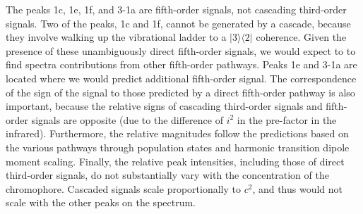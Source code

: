 The peaks 1c, 1e, 1f, and 3-1a are fifth-order signals, not cascading third-order signals. Two of the peaks, 1c and 1f, cannot be generated by a cascade, because they involve walking up the vibrational ladder to a $|3\rangle\langle2|$ coherence. Given the presence of these unambiguously direct fifth-order signals, we would expect to to find spectra contributions from other fifth-order pathways. Peaks 1e and 3-1a are located where we would predict additional fifth-order signal. The correspondence of the sign of the signal to those predicted by a direct fifth-order pathway is also important, because the relative signs of cascading third-order signals and fifth-order signals are opposite (due to the difference of $i^2$ in the pre-factor in the infrared). Furthermore, the relative magnitudes follow the predictions based on the various pathways through population states and harmonic transition dipole moment scaling.\cite{Garrett-Roe2009b} Finally, the relative peak intensities, including those of direct third-order signals, do not substantially vary with the concentration of the chromophore. Cascaded signals scale proportionally to $c^2$, and thus would not scale with the other peaks on the spectrum.

